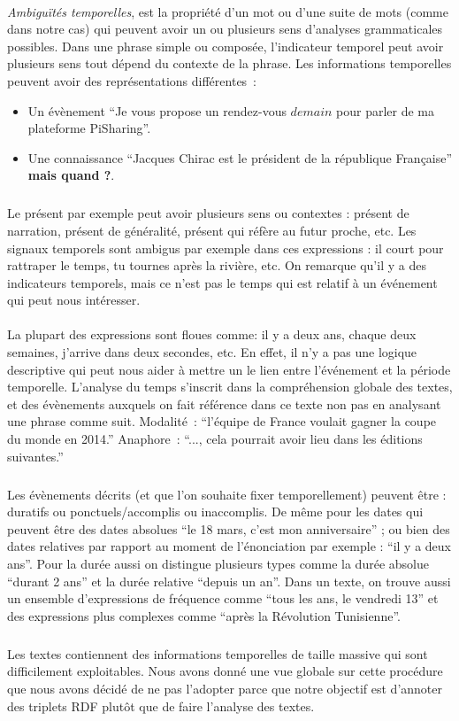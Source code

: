 \paragraph{}
{\it Ambiguïtés temporelles}, est la propriété d'un mot ou d'une suite de mots (comme dans notre cas) qui peuvent avoir un ou plusieurs sens d'analyses grammaticales possibles. Dans une phrase simple ou composée, l'indicateur temporel peut avoir plusieurs sens tout dépend du contexte de la phrase. Les informations temporelles peuvent avoir des représentations différentes~: 
\begin{itemize}
\item Un évènement ``Je vous propose un rendez-vous $demain$ pour parler de ma plateforme PiSharing''. \item Une connaissance ``Jacques Chirac est le président de la république Française'' \textbf{ mais quand ?}.
\end{itemize}

\subparagraph{} 
Le présent par exemple peut avoir plusieurs sens ou contextes : présent de narration, présent de généralité, présent qui réfère au futur proche, etc.
Les signaux temporels sont ambigus par exemple dans ces expressions : il court pour rattraper le temps, tu tournes après la rivière, etc. On remarque qu'il y a des indicateurs temporels, mais ce n'est pas le temps qui est relatif à un événement qui peut nous intéresser.
\paragraph{}
La plupart des expressions sont floues comme: il y a deux ans, chaque deux semaines, j’arrive dans deux secondes, etc. En effet, il n'y a pas une logique descriptive qui peut nous aider à mettre un le lien entre l'événement et la période temporelle. L’analyse du temps s’inscrit dans la compréhension globale des textes, et des évènements auxquels on fait référence dans ce texte non pas en analysant une phrase comme suit. 
\newline
Modalité~: ``l’équipe de France voulait gagner la coupe du monde en 2014.'' 
\newline
Anaphore~:  ``..., cela pourrait avoir lieu dans les éditions suivantes.''
\subparagraph{}
Les évènements décrits (et que l’on souhaite fixer temporellement) peuvent être : duratifs ou ponctuels/accomplis ou inaccomplis. 
De même pour les dates qui peuvent être des dates absolues ``le 18 mars, c'est mon anniversaire'' ; ou bien des dates relatives par rapport au moment de l’énonciation par exemple : ``il y a deux ans''. Pour la durée aussi on distingue plusieurs types comme la durée absolue ``durant 2 ans'' et la durée relative ``depuis un an''. Dans un texte, on trouve aussi un ensemble d'expressions de fréquence comme ``tous les ans, le vendredi 13'' et des expressions plus complexes comme ``après la Révolution Tunisienne''.
\subparagraph{}
Les textes contiennent des informations temporelles de taille massive qui sont difficilement exploitables. Nous avons donné une vue globale sur cette procédure que nous avons décidé de ne pas l'adopter parce que notre objectif est d'annoter des triplets RDF plutôt que de faire l'analyse des textes.
